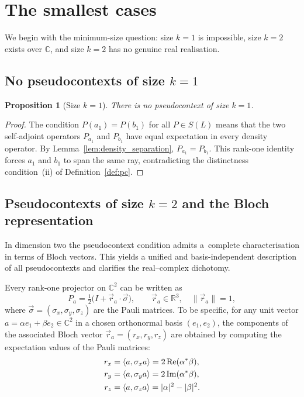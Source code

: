 \documentclass[
  twocolumn,
  aps,
  pra,
  floatfix,
  amsmath,amssymb,
  longbibliography
]{revtex4-2}
\newtheorem{proposition}[theorem]{Proposition}
\theoremstyle{definition}
\theoremstyle{remark}
\begin{document}
\section{The smallest cases}

We begin with the minimum-size question: size $k=1$ is impossible,
size $k=2$ exists over $\mathbb{C}$, and size $k=2$ has no genuine real
realisation.
\subsection{No pseudocontexts of size \texorpdfstring{$k=1$}{k=1}}

\begin{proposition}[Size $k=1$]\label{prop:k1}
There is no pseudocontext of size $k=1$.
\end{proposition}

\begin{proof}
The condition $P(a_1)=P(b_1)$ for all $P\in S(L)$ means that the two
self-adjoint operators $P_{a_1}$ and $P_{b_1}$ have equal expectation
in every density operator.  By Lemma~\ref{lem:density_separation},
$P_{a_1}=P_{b_1}$.  This rank-one
identity forces $a_1$ and $b_1$ to span the same ray, contradicting
the distinctness condition~(ii) of Definition~\ref{def:pc}.
\end{proof}


\subsection{Pseudocontexts of size \texorpdfstring{$k=2$}{k=2} and the Bloch representation}
\label{sec:d2}

In dimension two the pseudocontext condition admits a~complete
characterisation in terms of Bloch vectors.  This yields a unified and
basis-independent description of all pseudocontexts and clarifies the
real--complex dichotomy.

Every rank-one projector on $\mathbb{C}^2$ can be written as
\begin{equation}
  P_a=\tfrac{1}{2}\bigl(I+\vec{r}_a\cdot\vec{\sigma}\bigr),
  \qquad \vec{r}_a\in\mathbb{R}^3,\quad \|\vec{r}_a\|=1,
  \label{eq:bloch}
\end{equation}
where $\vec{\sigma}=(\sigma_x,\sigma_y,\sigma_z)$ are the Pauli
matrices.  To be specific, for any unit vector $a=\alpha e_1+\beta e_2
\in\mathbb{C}^2$ in a chosen orthonormal basis $(e_1,e_2)$, the
components of the associated Bloch vector $\vec{r}_a=(r_x,r_y,r_z)$
are obtained by computing the expectation values of the Pauli
matrices:
\begin{align}
  r_x &= \langle a,\sigma_x a\rangle = 2\operatorname{Re}(\alpha^*\beta), \notag \\
  r_y &= \langle a,\sigma_y a\rangle = 2\operatorname{Im}(\alpha^*\beta),
        \label{eq:bloch_components} \\
  r_z &= \langle a,\sigma_z a\rangle = |\alpha|^2-|\beta|^2. \notag
\end{align}
\end{document}
